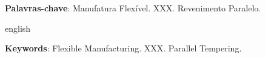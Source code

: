 
\setlength{\absparsep}{18pt} %
\begin{resumo}


 \vspace{\onelineskip}
 \noindent
 \textbf{Palavras-chave}: Manufatura Flexível. XXX. Revenimento Paralelo. 

\end{resumo}

\begin{resumo}[Abstract]
 \begin{otherlanguage*}{english}
  
  \vspace{\onelineskip}
   \noindent 
   \textbf{Keywords}: Flexible Manufacturing. XXX. Parallel Tempering.
 \end{otherlanguage*}
\end{resumo}